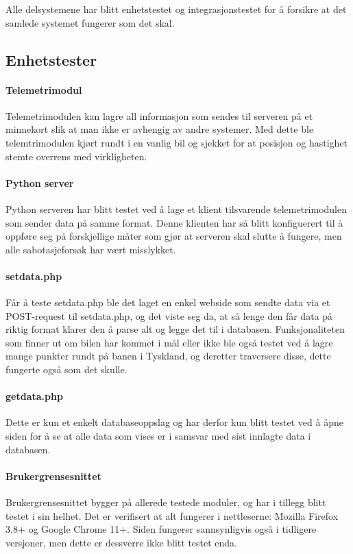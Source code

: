 Alle delsystemene har blitt enhetstestet og integrasjonstestet for å forsikre at det samlede systemet fungerer som det skal.
\subsection{Enhetstester}
\paragraph{Telemetrimodul}
Telemetrimodulen kan lagre all informasjon som sendes til serveren på et minnekort slik at man ikke er avhengig av andre systemer.
Med dette ble telemtrimodulen kjørt rundt i en vanlig bil og sjekket for at posisjon og hastighet stemte overrens med virkligheten.
\paragraph{Python server}
Python serveren har blitt testet ved å lage et klient tilsvarende telemetrimodulen som sender data på samme format.
Denne klienten har så blitt konfiguerert til å oppføre seg på forskjellige måter som gjør at serveren skal slutte å fungere, men alle sabotasjeforsøk har vært misslykket.
\paragraph{setdata.php}
Får å teste setdata.php ble det laget en enkel webside som sendte data via et POST-request til setdata.php, og det viste seg da, at så lenge den får data på riktig format klarer den å parse alt og legge det til i databasen.
Funksjonaliteten som finner ut om bilen har kommet i mål eller ikke ble også testet ved å lagre mange punkter rundt på banen i Tyskland, og deretter traversere disse, dette fungerte også som det skulle.
\paragraph{getdata.php}
Dette er kun et enkelt databaseoppslag og har derfor kun blitt testet ved å åpne siden for å se at alle data som vises er i samsvar med sist innlagte data i databasen.
\paragraph{Brukergrensesnittet}
Brukergrensesnittet bygger på allerede testede moduler, og har i tillegg blitt testet i sin helhet. Det er verifisert at alt fungerer i nettleserne: Mozilla Firefox 3.8+ og Google Chrome 11+. Siden fungerer sannsynligvis også i tidligere versjoner, men dette er dessverre ikke blitt testet enda.

